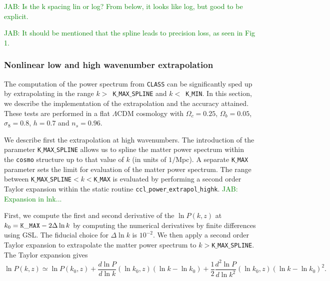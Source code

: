 \documentclass[\docopts]{\docclass}
\newcommand{\jab}[1]{\textcolor{green}{JAB: #1}}
\begin{document}
\jab{Is the k spacing lin or log? From below, it looks like log, but good to be explicit.}

\jab{It should be mentioned that the spline leads to precision loss, as seen in Fig 1.}

\subsubsection{Nonlinear low and high wavenumber extrapolation}
\label{sec:NLextrapol}

The computation of the power spectrum from {\tt CLASS} can be significantly sped up by extrapolating in the range $k>$~{\tt K$\_$MAX$\_$SPLINE} and $k<$~{\tt K$\_$MIN}. In this section, we describe the implementation of the extrapolation and the accuracy attained. These tests are performed in a flat $\Lambda$CDM cosmology with $\Omega_c=0.25$, $\Omega_b=0.05$, $\sigma_8=0.8$, $h=0.7$ and $n_s=0.96$.

We describe first the extrapolation at high wavenumbers. The introduction of the parameter {\tt K$\_$MAX$\_$SPLINE} allows us to spline the matter power spectrum within the {\tt cosmo} structure up to that value of $k$ (in units of $1/$Mpc). A separate {\tt K$\_$MAX} parameter sets the limit for evaluation of the matter power spectrum. The range between {\tt K$\_$MAX$\_$SPLINE}$<k<${\tt K$\_$MAX} is evaluated by performing a second order Taylor expansion within the static routine {\tt ccl$\_$power$\_$extrapol$\_$highk}. \jab{Expansion in lnk...}

First, we compute the first and second derivative of the $\ln P(k,z)$ at $k_0={\rm \tt K\_MAX}-2\Delta\ln k$ by computing the numerical derivatives by finite differences using GSL. The fiducial choice for $\Delta\ln k$ is $10^{-2}$. We then apply a second order Taylor expansion to extrapolate the matter power spectrum to $k>${\tt K$\_$MAX$\_$SPLINE}. The Taylor expansion gives
%
\begin{equation}
  \ln P(k,z) \simeq \ln P(k_0,z) + \frac{d\ln P}{d\ln k}(\ln k_0,z) (\ln k-\ln k_0)  + \frac{1}{2}  \frac{d^2\ln P}{d\ln k^2}(\ln k_0,z) (\ln k-\ln k_0)^2.
  \label{eq:NLPSTaylor}
\end{equation}
\end{document}
